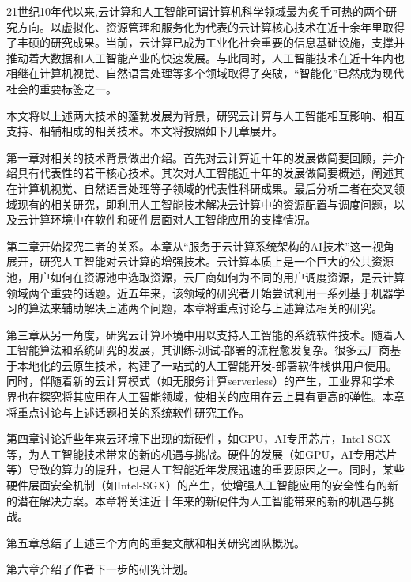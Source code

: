 
\begin{cabstract}
	21世纪10年代以来,云计算和人工智能可谓计算机科学领域最为炙手可热的两个研究方向。以虚拟化、资源管理和服务化为代表的云计算核心技术在近十余年里取得了丰硕的研究成果。当前，云计算已成为工业化社会重要的信息基础设施，支撑并推动着大数据和人工智能产业的快速发展。与此同时，人工智能技术在近十年内也相继在计算机视觉、自然语言处理等多个领域取得了突破，“智能化”已然成为现代社会的重要标签之一。
	
	本文将以上述两大技术的蓬勃发展为背景，研究云计算与人工智能相互影响、相互支持、相辅相成的相关技术。本文将按照如下几章展开。
	
	第一章对相关的技术背景做出介绍。首先对云计算近十年的发展做简要回顾，并介绍具有代表性的若干核心技术。其次对人工智能近十年的发展做简要概述，阐述其在计算机视觉、自然语言处理等子领域的代表性科研成果。最后分析二者在交叉领域现有的相关研究，即利用人工智能技术解决云计算中的资源配置与调度问题，以及云计算环境中在软件和硬件层面对人工智能应用的支撑情况。
	
	第二章开始探究二者的关系。本章从“服务于云计算系统架构的AI技术”这一视角展开，研究人工智能对云计算的增强技术。云计算本质上是一个巨大的公共资源池，用户如何在资源池中选取资源，云厂商如何为不同的用户调度资源，是云计算领域两个重要的话题。近五年来，该领域的研究者开始尝试利用一系列基于机器学习的算法来辅助解决上述两个问题，本章将重点讨论与上述算法相关的研究。
	
	第三章从另一角度，研究云计算环境中用以支持人工智能的系统软件技术。随着人工智能算法和系统研究的发展，其训练-测试-部署的流程愈发复杂。很多云厂商基于本地化的云原生技术，构建了一站式的人工智能开发-部署软件栈供用户使用。同时，伴随着新的云计算模式（如无服务计算serverless）的产生，工业界和学术界也在探究将其应用在人工智能领域，使相关的应用在云上具有更高的弹性。本章将重点讨论与上述话题相关的系统软件研究工作。
	
	第四章讨论近些年来云环境下出现的新硬件，如GPU，AI专用芯片，Intel-SGX等，为人工智能技术带来的新的机遇与挑战。硬件的发展（如GPU，AI专用芯片等）导致的算力的提升，也是人工智能近年发展迅速的重要原因之一。同时，某些硬件层面安全机制（如Intel-SGX）的产生，使增强人工智能应用的安全性有的新的潜在解决方案。本章将关注近十年来的新硬件为人工智能带来的新的机遇与挑战。
	
	第五章总结了上述三个方向的重要文献和相关研究团队概况。
	
	第六章介绍了作者下一步的研究计划。

\end{cabstract}


